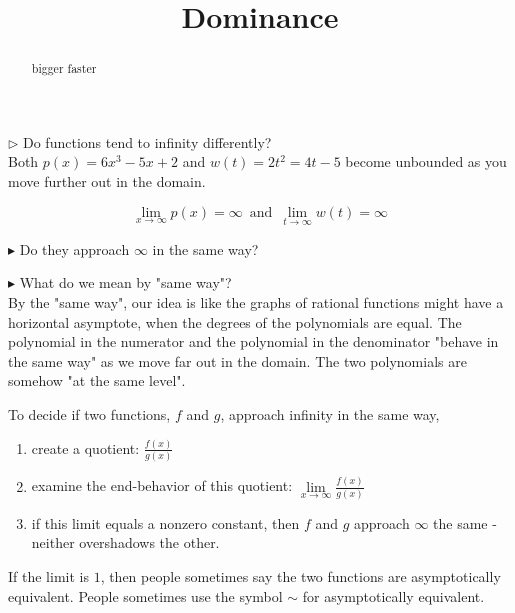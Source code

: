 \documentclass{ximera}
\title{Dominance}
\begin{document}
\begin{abstract}
bigger faster
\end{abstract}
\maketitle







$\rhd$ Do functions tend to infinity differently? \\




Both $p(x) = 6x^3 - 5x + 2$ and $w(t) = 2t^2 = 4t - 5$ become unbounded as you move further out in the domain.



\[    \lim_{x \to \infty} p(x) = \infty  \, \text{ and }  \,       \lim_{t \to \infty} w(t) = \infty                \]

$\blacktriangleright$ Do they approach $\infty$ in the same way? 

$\blacktriangleright$ What do we mean by "same way"?  \\






By the "same way", our idea is like the graphs of rational functions might have a horizontal asymptote, when the degrees of the polynomials are equal.   The polynomial in the numerator and the polynomial in the denominator "behave in the same way" as we move far out in the domain.  The two polynomials are somehow "at the same level". \\




\begin{idea}


To decide if two functions, $f$ and $g$, approach infinity in the same way, 

\begin{enumerate}
\item create a quotient: $\frac{f(x)}{g(x)}$ \\


\item examine the end-behavior of this quotient: $\lim\limits_{x \to \infty} \frac{f(x)}{g(x)}$ \\


\item if this limit equals a nonzero constant, then $f$ and $g$ approach $\infty$ the same - neither overshadows the other.
\end{enumerate}


If the limit is $1$, then people sometimes say the two functions are asymptotically equivalent. People sometimes use the symbol $\sim$ for asymptotically equivalent. \\

\end{idea}
\end{document}
